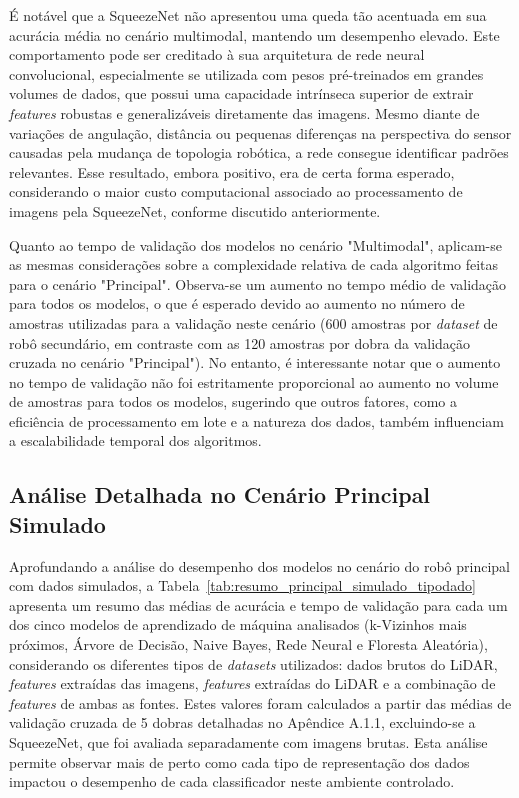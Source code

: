 É notável que a SqueezeNet não apresentou uma queda tão acentuada em sua acurácia média no cenário multimodal, mantendo um desempenho elevado. Este comportamento pode ser creditado à sua arquitetura de rede neural convolucional, especialmente se utilizada com pesos pré-treinados em grandes volumes de dados, que possui uma capacidade intrínseca superior de extrair \textit{features} robustas e generalizáveis diretamente das imagens. Mesmo diante de variações de angulação, distância ou pequenas diferenças na perspectiva do sensor causadas pela mudança de topologia robótica, a rede consegue identificar padrões relevantes. Esse resultado, embora positivo, era de certa forma esperado, considerando o maior custo computacional associado ao processamento de imagens pela SqueezeNet, conforme discutido anteriormente.

Quanto ao tempo de validação dos modelos no cenário "Multimodal", aplicam-se as mesmas considerações sobre a complexidade relativa de cada algoritmo feitas para o cenário "Principal". Observa-se um aumento no tempo médio de validação para todos os modelos, o que é esperado devido ao aumento no número de amostras utilizadas para a validação neste cenário (600 amostras por \textit{dataset} de robô secundário, em contraste com as 120 amostras por dobra da validação cruzada no cenário "Principal"). No entanto, é interessante notar que o aumento no tempo de validação não foi estritamente proporcional ao aumento no volume de amostras para todos os modelos, sugerindo que outros fatores, como a eficiência de processamento em lote e a natureza dos dados, também influenciam a escalabilidade temporal dos algoritmos.

\subsection{Análise Detalhada no Cenário Principal Simulado}

Aprofundando a análise do desempenho dos modelos no cenário do robô principal com dados simulados, a Tabela~\ref{tab:resumo_principal_simulado_tipodado} apresenta um resumo das médias de acurácia e tempo de validação para cada um dos cinco modelos de aprendizado de máquina analisados (k-Vizinhos mais próximos, Árvore de Decisão, Naive Bayes, Rede Neural e Floresta Aleatória), considerando os diferentes tipos de \textit{datasets} utilizados: dados brutos do LiDAR, \textit{features} extraídas das imagens, \textit{features} extraídas do LiDAR e a combinação de \textit{features} de ambas as fontes. Estes valores foram calculados a partir das médias de validação cruzada de 5 dobras detalhadas no Apêndice A.1.1, excluindo-se a SqueezeNet, que foi avaliada separadamente com imagens brutas. Esta análise permite observar mais de perto como cada tipo de representação dos dados impactou o desempenho de cada classificador neste ambiente controlado.


